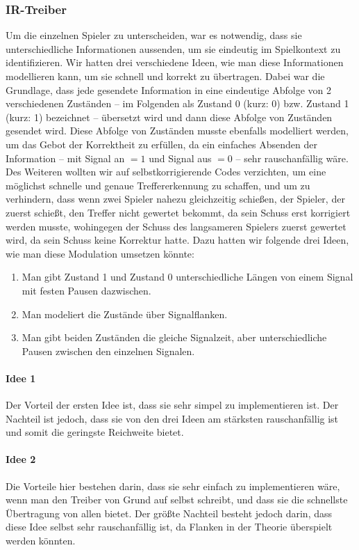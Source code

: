 \subsubsection{IR-Treiber}
\label{sec:ir-treiber}

Um die einzelnen Spieler zu unterscheiden, war es notwendig, dass sie unterschiedliche
Informationen aussenden, um sie eindeutig im Spielkontext zu identifizieren.
Wir hatten drei verschiedene Ideen, wie man diese Informationen modellieren kann, um sie schnell und 
korrekt zu übertragen.
Dabei war die Grundlage, dass jede gesendete Information in eine eindeutige Abfolge von 2
verschiedenen Zuständen – im Folgenden als Zustand 0 (kurz: 0) bzw. Zustand 1 (kurz: 1)
bezeichnet – übersetzt wird und dann diese Abfolge von Zuständen gesendet wird.
Diese Abfolge von Zuständen musste ebenfalls modelliert werden, um das Gebot der Korrektheit zu
erfüllen, da ein einfaches Absenden der Information – mit Signal an $= 1$ und Signal aus $= 0$ –
sehr rauschanfällig wäre.
Des Weiteren wollten wir auf selbstkorrigierende Codes verzichten, um eine möglichst schnelle und
genaue Treffererkennung zu schaffen, und um zu verhindern, dass wenn zwei Spieler nahezu
gleichzeitig schießen, der Spieler, der zuerst schießt, den Treffer nicht gewertet bekommt, da sein
Schuss erst korrigiert werden musste, wohingegen der Schuss des langsameren Spielers zuerst gewertet
wird, da sein Schuss keine Korrektur hatte.
Dazu hatten wir folgende drei Ideen, wie man diese Modulation umsetzen könnte:
\begin{enumerate}
  \item
    Man gibt Zustand 1 und Zustand 0 unterschiedliche Längen von einem Signal mit festen Pausen
    dazwischen.
  \item
	Man modeliert die Zustände über Signalflanken.
  \item
	Man gibt beiden Zuständen die gleiche Signalzeit, aber unterschiedliche Pausen zwischen den
	einzelnen Signalen.
\end{enumerate}

\paragraph{Idee 1}
Der Vorteil der ersten Idee ist, dass sie sehr simpel zu implementieren ist.
Der Nachteil ist jedoch, dass sie von den drei Ideen am stärksten rauschanfällig ist und somit die
geringste Reichweite bietet.

\paragraph{Idee 2}
Die Vorteile hier bestehen darin, dass sie sehr einfach zu implementieren wäre, wenn man den Treiber
von Grund auf selbst schreibt, und dass sie die schnellste Übertragung von allen bietet.
Der größte Nachteil besteht jedoch darin, dass diese Idee selbst sehr rauschanfällig ist, da Flanken
in der Theorie überspielt werden könnten.

